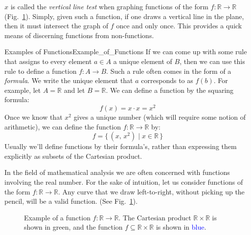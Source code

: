         $x$ is called the \textit{vertical line test} when graphing functions
        of the form $f:\mathbb{R}\rightarrow\mathbb{R}$
        (Fig.~\ref{fig:Function_R_to_R_Subset_Cart_Prod}). Simply, given such
        a function, if one draws a vertical line in the plane, then it must
        intersect the graph of $f$ once and only once. This provides a
        quick means of discerning functions from non-functions.
        \begin{fexample}{Examples of Functions}{Example_of_Functions}
            If we can come up with some rule that assigns to every element
            $a\in{A}$ a unique element of $B$, then we can use this rule to
            define a function $f:A\rightarrow{B}$. Such a rule often comes
            in the form of a \textit{formula}. We write the unique element that
            $a$ corresponds to as $f(b)$. For example, let $A=\mathbb{R}$ and
            let $B=\mathbb{R}$. We can define a function by the squaring
            formula:
            \begin{equation}
                f(x)=x\cdot{x}=x^{2}
            \end{equation}
            Once we know that $x^{2}$ gives a unique number
            (which will require some notion of arithmetic), we can define
            the function $f:\mathbb{R}\rightarrow\mathbb{R}$ by:
            \begin{equation}
                f=\{\,(x,\,x^{2})\;|\;x\in\mathbb{R}\,\}
            \end{equation}
            Usually we'll define functions by their formula's, rather than
            expressing them explicitly as subsets of the Cartesian product.
        \end{fexample}
        In the field of mathematical analysis we are often concerned with
        functions involving the real number. For the sake of intuition, let
        us consider functions of the form $f:\mathbb{R}\rightarrow\mathbb{R}$.
        Any curve that we draw left-to-right, without picking up the pencil,
        will be a valid function.
        (See Fig.~\ref{fig:Function_R_to_R_Subset_Cart_Prod}).
        \begin{figure}[H]
            \centering
            
            \caption[Example of a Function
                     $f:\mathbb{R}\rightarrow\mathbb{R}$]
                    {Example of a function
                     $f:\mathbb{R}\rightarrow\mathbb{R}$.
                     The Cartesian product $\mathbb{R}\times\mathbb{R}$ is
                     shown in \textcolor{green!80!black}{green}, and the
                     function $f\subseteq\mathbb{R}\times\mathbb{R}$ is shown
                     in \textcolor{blue}{blue}.}
            \label{fig:Function_R_to_R_Subset_Cart_Prod}
        \end{figure}
